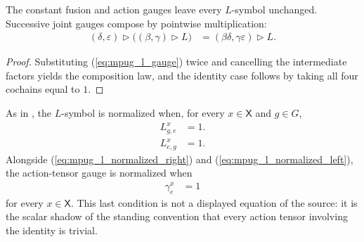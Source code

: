 \begin{lemma}
    \label{thm:mpug_l_gauge_composition}
    \leanok
    The constant fusion and action gauges leave every $L$-symbol unchanged.
    Successive joint gauges compose by pointwise multiplication:
    \begin{align}
        (\delta,\varepsilon)\mathbin{\triangleright}
        \bigl((\beta,\gamma)\mathbin{\triangleright}L\bigr)
         & = (\beta\delta,\gamma\varepsilon)
        \mathbin{\triangleright}L.
        \label{eq:mpug_l_gauge_composition}
    \end{align}
\end{lemma}

\begin{proof}\leanok
    Substituting (\ref{eq:mpug_l_gauge}) twice and cancelling the intermediate
    factors yields the composition law, and the identity case
    follows by taking all four cochains equal to $1$.
\end{proof}

\begin{definition}
    \label{def:mpug_l_normalized}
    \leanok
    As in \cite{FrancoRubio2025MPUGauging}, the $L$-symbol is normalized when,
    for every $x\in\mathsf X$ and $g\in G$,
    \begin{align}
        L^x_{g,e} & =1.
        \label{eq:mpug_l_normalized_right}
    \end{align}
    \begin{align}
        L^x_{e,g} & =1.
        \label{eq:mpug_l_normalized_left}
    \end{align}
    Alongside (\ref{eq:mpug_l_normalized_right}) and
    (\ref{eq:mpug_l_normalized_left}), the action-tensor gauge is normalized
    when
    \begin{align}
        \gamma^x_e & =1
        \label{eq:mpug_action_gauge_normalized}
    \end{align}
    for every $x\in\mathsf X$. This last condition is not a displayed
    equation of the source: it is the scalar shadow of the standing
    convention that every action tensor involving the identity is trivial.
\end{definition}

